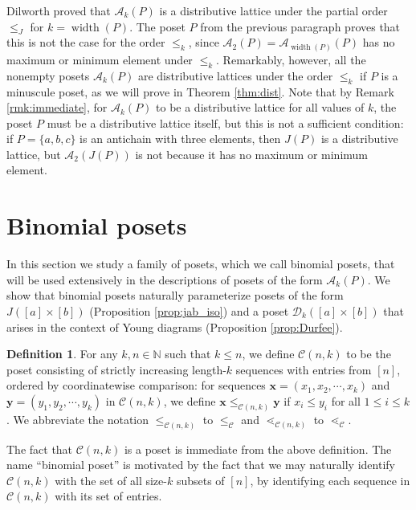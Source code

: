 \documentclass[11pt]{amsart}
\theoremstyle{plain}
\theoremstyle{definition}
\newtheorem{definition}[theorem]{Definition}
\theoremstyle{remark}
\numberwithin{equation}{section}
\newcommand{\N}{\mathbb{N}}
\newcommand{\cala}{\mathcal{A}}
\newcommand{\calc}{\mathcal{C}}
\newcommand{\cald}{\mathcal{D}}
\newcommand{\bfx}{\mathbf{x}}
\newcommand{\bfy}{\mathbf{y}}
\newcommand{\akp}{\mathcal{A}_k(P)}
\DeclareMathOperator{\width}{\mathrm{width}}
\begin{document}
Dilworth \cite[Theorem 2.1]{dilworth60} proved that  $\cala_k(P)$ is a
distributive lattice under the partial order $\leq_J$ for $k=\width(P)$. The
poset $P$ from the previous paragraph proves that this is not the case for the
order $\leq_k$, since $\cala_2(P)=\cala_{\width(P)}(P)$ has no maximum or
minimum element under $\le_k$. Remarkably, however, all the nonempty posets
$\cala_k(P)$ are distributive lattices under the order $\leq_k$ if $P$ is a
minuscule poset, as we will prove in Theorem \ref{thm:dist}. Note that by Remark
\ref{rmk:immediate}, for $\cala_k(P)$ to be a distributive lattice for all
values of $k$, the poset $P$ must be a distributive lattice itself, but this is
not a sufficient condition: if $P=\{a,b,c\}$ is an antichain with three
elements, then $J(P)$ is a distributive lattice, but $\cala_2(J(P))$ is not
because it has no maximum or minimum element. 


\section{Binomial posets}
\label{sec:sequence_posets}
In this section we study a family of posets, which we call binomial posets, that
will be used extensively in the descriptions of posets of the form $\akp$. We
show that binomial posets naturally parameterize posets of the form $J([a]\times
[b])$ (Proposition \ref{prop:jab_iso}) and a poset $\cald_k([a]\times[b])$ that
arises in the context of Young diagrams (Proposition \ref{prop:Durfee}).  


\begin{definition}\label{def:cak}
For any $k,n\in \N$ such that $k \leq n$, we define $\calc(n,k)$ to be the poset
consisting of strictly increasing length-$k$ sequences with entries from $[n]$,
ordered by coordinatewise comparison: for sequences $\bfx = (x_1, x_2, \cdots,
x_k)$ and $\bfy = (y_1, y_2, \cdots, y_k)$ in $\calc(n, k)$, we define
$\bfx\le_{\calc(n,k)} \bfy$ if $x_i\le y_i$ for all $1\le i\le k$.  We
abbreviate the notation $\le_{\calc(n,k)}$ to $\le_\calc$ and
$\lessdot_{\calc(n,k)}$ to $\lessdot_\calc$.
\end{definition}

The fact that $\calc(n,k)$ is a poset is immediate from the above definition.
The name ``binomial poset'' is motivated by the fact that we may naturally
identify $\calc(n,k)$ with the set of all size-$k$ subsets of $[n]$, by
identifying each sequence in $\calc(n,k)$ with its set of entries.


\end{document}
